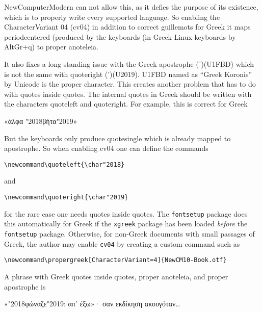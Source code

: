 \documentclass{article}
\newcommand\quoteleft{\char"2018}
\newcommand\quoteright{\char"2019}
\begin{document}
NewComputerModern can not allow this, as it defies the purpose of its
existence, which is to properly write every supported language. So
enabling the CharacterVariant 04 (cv04) in addition to correct
guillemots for Greek it maps periodcentered (produced by the keyboards
(in Greek Linux keyboards by AltGr+q) to proper anoteleia.

It also fixes a long standing issue with the Greek apostrophe (᾽)(U1FBD) which
is not the same with quoteright (’)(U2019). U1FBD named as ``Greek Koronis''
by Unicode is the proper character. This creates another problem that has to do with
quotes inside quotes. The internal quotes in Greek should be written with
the characters quoteleft and quoteright. For example, this is correct for Greek
\begin{center}
 {\newcmgreekguillemots  «άλφα \quoteleft βήτα\quoteright»}
\end{center}
But the keyboards only produce quotesingle which is already mapped to apostrophe.
So when enabling cv04 one can define the commands

\verb|\newcommand\quoteleft{\char"2018}|

\noindent and

\verb|\newcommand\quoteright{\char"2019}|

\noindent for the rare case one needs quotes inside quotes. The \verb|fontsetup| package
does this automatically for Greek if the \verb|xgreek| package has been loaded \textit{before}
the \verb|fontsetup| package. Otherwise, for non-Greek documents with small passages of Greek,
the author may enable \verb|cv04| by creating a custom command such as

\verb|\newcommand\propergreek[CharacterVariant=4]{NewCM10-Book.otf}|


A phrase with Greek quotes inside quotes, proper anoteleia, and proper apostrophe is

\begin{center}
{\newcmgreekguillemots  «\quoteleft φώναζε\quoteright: απ' έξω»· σαν εκδίκηση ακουγόταν\ldots}
\end{center}
\end{document}
